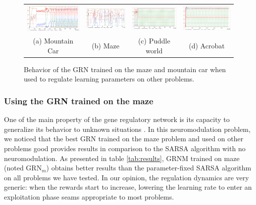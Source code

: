 \begin{figure}[b!]
\center
\setlength{\tabcolsep}{0.5mm}
\begin{tabular}{cccc}
\includegraphics[width=0.245\linewidth]{MC_GRNGenericBehavior.pdf} &
\includegraphics[width=0.245\linewidth]{MZ_GRNGenericBehavior.pdf} &
\includegraphics[width=0.245\linewidth]{PW_GRNGenericBehavior.pdf} &
\includegraphics[width=0.245\linewidth]{ACP_GRNGenericBehavior.pdf} \\
(a) Mountain Car & (b) Maze & (c) Puddle world & (d) Acrobat
\end{tabular}
\caption{Behavior of the GRN trained on the maze and mountain car when used to regulate learning parameters on other problems.}\label{fig:GRNGenericBehavior}
\end{figure}

\subsubsection{Using the GRN trained on the maze}
One of the main property of the gene regulatory network is its capacity to generalize its behavior to unknown situations \cite{sanchez2014gene}. In this neuromodulation problem, we noticed that the best GRN trained on the maze problem and used on other problems good provides results in comparison to the SARSA algorithm with no neuromodulation. As presented in table \ref{tab:results}, GRNM trained on maze (noted GRN$_{m}$) obtains better results than the parameter-fixed SARSA algorithm on all problems we have tested. In our opinion, the regulation dynamics are very generic: when the rewards start to increase, lowering the learning rate to enter an exploitation phase seams appropriate to most problems.

